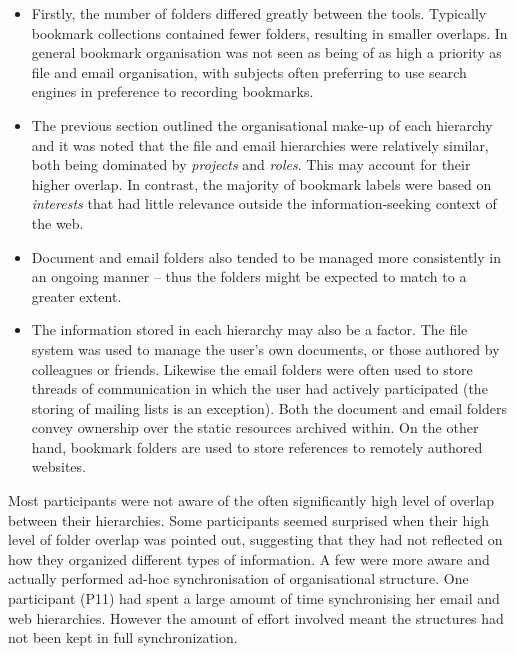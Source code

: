 \begin{itemize}

\item Firstly, the number of folders differed greatly between the tools.  Typically bookmark collections contained fewer folders, resulting in smaller overlaps. In general bookmark organisation was not seen as being of as high a priority as file and email organisation, with subjects often preferring to use search engines in preference to recording bookmarks.

\item The previous section outlined the organisational make-up of each hierarchy and it was noted that the file and email hierarchies were relatively similar, both being dominated by \textit{projects} and \textit{roles}. This may account for their higher overlap. In contrast, the majority of bookmark labels were based on  \textit{interests} that had little relevance outside the information-seeking context of the web.

\item Document and email folders also tended to be managed more consistently in an ongoing manner -- thus the folders might be expected to match to a greater extent.

\item The information stored in each hierarchy may also be a factor. The file system was used to manage the user's own documents, or those authored by colleagues or friends. Likewise the email folders were often used to store threads of communication in which the user had actively participated (the storing of mailing lists is an exception). Both the document and email folders convey ownership over the static resources archived within. On the other hand, bookmark folders are used to store references to remotely authored websites. 

\end{itemize}

Most participants were not aware of the often significantly high level of overlap between their hierarchies.  Some participants seemed surprised when their high level of folder overlap was pointed out, suggesting that they had not reflected on how they organized different types of information.  A few were more aware and actually performed ad-hoc synchronisation of organisational structure. One participant (P11) had spent a large amount of time synchronising her email and web hierarchies. However the amount of effort involved meant the structures had not been kept in full synchronization.

